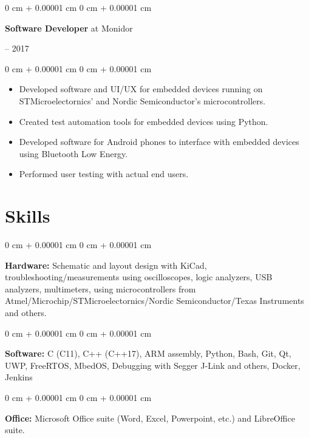 \documentclass{article}
\newenvironment{highlights}{
    \begin{itemize}[
        topsep=0.10 cm,
        parsep=0.10 cm,
        partopsep=0pt,
        itemsep=0pt,
        leftmargin=0 cm + 10pt
    ]
}{
    \end{itemize}
}
\newenvironment{onecolentry}{
    \begin{adjustwidth}{
        0 cm + 0.00001 cm
    }{
        0 cm + 0.00001 cm
    }
}{
    \end{adjustwidth}
}
\newenvironment{twocolentry}[2][]{
    \onecolentry
    \def\secondColumn{#2}
    \setcolumnwidth{\fill, 4.5 cm}
    \begin{paracol}{2}
}{
    \switchcolumn \raggedleft \secondColumn
    \end{paracol}
    \endonecolentry
}
\begin{document}
    \begin{twocolentry}{2016 -- 2017}
      \textbf{Software Developer} at Monidor
    \end{twocolentry}
    \vspace{0.1 cm}
    \begin{onecolentry}
      \begin{highlights}
        \item Developed software and UI/UX for embedded devices running on STMicroelectornics' and Nordic Semiconductor's microcontrollers.
        \item Created test automation tools for embedded devices using Python.
        \item Developed software for Android phones to interface with embedded devices using Bluetooth Low Energy.
        \item Performed user testing with actual end users.
      \end{highlights}
    \end{onecolentry}
  \section{Skills}
    \begin{onecolentry}
      \textbf{Hardware:} Schematic and layout design with KiCad, troubleshooting/measurements using oscilloscopes, logic analyzers, USB analyzers, multimeters, using microcontrollers from Atmel/Microchip/STMicroelectornics/Nordic Semiconductor/Texas Instruments and others.
    \end{onecolentry}
    \vspace{0.3 cm}
    \begin{onecolentry}
      \textbf{Software:} C (C11), C++ (C++17), ARM assembly, Python, Bash, Git, Qt, UWP, FreeRTOS, MbedOS, Debugging with Segger J-Link and others, Docker, Jenkins
    \end{onecolentry}
    \vspace{0.3 cm}
    \begin{onecolentry}
      \textbf{Office:} Microsoft Office suite (Word, Excel, Powerpoint, etc.) and LibreOffice suite.
    \end{onecolentry}
  \newpage
\end{document}
